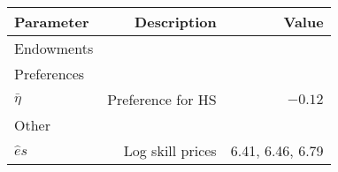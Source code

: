 \begin{tabular}{lrr}
\hline
Parameter & Description  & Value  \\ 
\hline
Endowments &   &   \\ 
Preferences &   &   \\ 
$\bar{\eta}$ & Preference for HS  & $-0.12$  \\ 
Other &   &   \\ 
$\hat{e}{s}$ & Log skill prices  & 6.41, 6.46, 6.79  \\ 
\hline
\end{tabular}%
